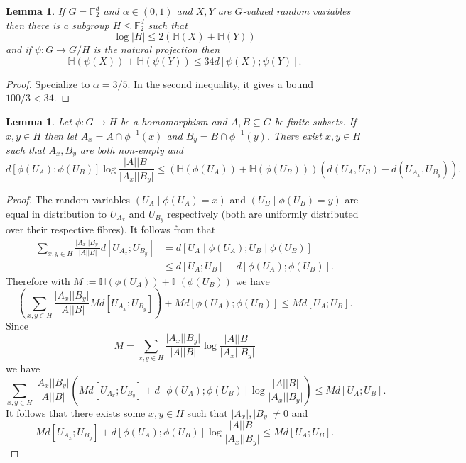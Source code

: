 \documentclass[10pt,a4paper]{article}
\newtheorem{lemma}[theorem]{Lemma}
\newcommand{\lean}[1]{}
\newcommand{\uses}[1]{}
\newcommand{\leanok}{}
\begin{document}
\begin{lemma}\label{pfr-projection}\lean{PFR_projection}\leanok
If $G=\mathbb{F}_2^d$ and $\alpha\in (0,1)$ and $X,Y$ are $G$-valued random
variables then there is a subgroup $H\leq \mathbb{F}_2^d$ such that
\[\log \lvert H\rvert \leq 2 (\mathbb{H}(X)+\mathbb{H}(Y))\]
and if $\psi:G \to G/H$ is the natural projection then
\[\mathbb{H}(\psi(X))+\mathbb{H}(\psi(Y))\leq 34 d[\psi(X);\psi(Y)].\]
\end{lemma}
\begin{proof}
\uses{pfr-projection'}\leanok
Specialize  to $\alpha=3/5$. In the second
inequality, it gives a bound $100/3 < 34$.
\end{proof}



\begin{lemma}\label{single-fibres}\lean{single_fibres}\leanok
Let $\phi:G\to H$ be a homomorphism and $A,B\subseteq G$ be finite subsets. If $x,y\in H$ then let $A_x=A\cap \phi^{-1}(x)$ and $B_y=B\cap \phi^{-1}(y)$. There exist $x,y\in H$ such that $A_x,B_y$ are both non-empty and
\[d[\phi(U_A);\phi(U_B)]\log \frac{\lvert A\rvert\lvert B\rvert}{\lvert A_x\rvert\lvert B_y\rvert}\leq (\mathbb{H}(\phi(U_A))+\mathbb{H}(\phi(U_B)))(d(U_A,U_B)-d(U_{A_x},U_{B_y})).\]
\end{lemma}
\begin{proof}
\uses{fibring-ident}\leanok
The random variables $(U_A\mid \phi(U_A)=x)$ and $(U_B\mid \phi(U_B)=y)$ are equal in distribution to $U_{A_x}$ and $U_{B_y}$ respectively (both are uniformly distributed over their respective fibres). It follows from  that
\begin{align*}
\sum_{x,y\in H}\frac{\lvert A_x\rvert\lvert B_y\rvert}{\lvert A\rvert\lvert B\rvert}d[U_{A_x};U_{B_y}]
&=d[U_A\mid \phi(U_A); U_B\mid \phi(U_B)]\\
&\leq d[U_A;U_B]-d[\phi(U_A);\phi(U_B)].
\end{align*}
Therefore with $M:=\mathbb{H}(\phi(U_A))+\mathbb{H}(\phi(U_B))$ we have
\[\left(\sum_{x,y\in H}\frac{\lvert A_x\rvert\lvert B_y\rvert}{\lvert A\rvert\lvert B\rvert}Md[U_{A_x};U_{B_y}]\right)+Md[\phi(U_A);\phi(U_B)]\leq Md[U_A;U_B].\]
Since
\[M=\sum_{x,y\in H}\frac{\lvert A_x\rvert\lvert B_y\rvert}{\lvert A\rvert\lvert B\rvert}\log \frac{\lvert A\rvert\lvert B\rvert}{\lvert A_x\rvert\lvert B_y\rvert}\]
we have
\[\sum_{x,y\in H} \frac{\lvert A_x\rvert\lvert B_y\rvert}{\lvert A\rvert\lvert B\rvert}\left(Md[U_{A_x};U_{B_y}]+d[\phi(U_A);\phi(U_B)]\log \frac{\lvert A\rvert\lvert B\rvert}{\lvert A_x\rvert\lvert B_y\rvert}\right)\leq  Md[U_A;U_B].\]
It follows that there exists some $x,y\in H$ such that $\lvert A_x\rvert,\lvert B_y\rvert\neq 0$ and
\[Md[U_{A_x};U_{B_y}]+d[\phi(U_A);\phi(U_B)]\log \frac{\lvert A\rvert\lvert B\rvert}{\lvert A_x\rvert\lvert B_y\rvert}\leq  Md[U_A;U_B].\]
\end{proof}
\end{document}
